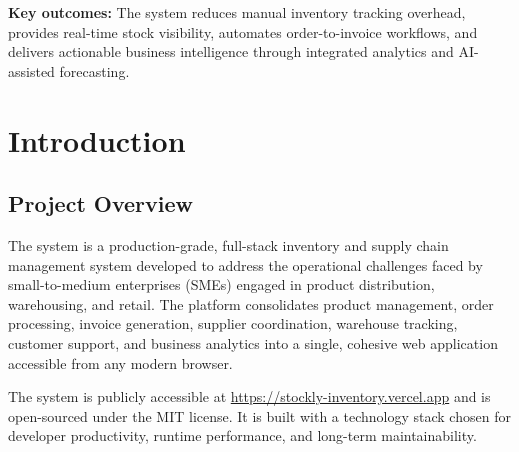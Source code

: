 ﻿\documentclass[12pt,a4paper]{report}
\begin{document}
\textbf{Key outcomes:} The system reduces manual inventory tracking overhead, provides real-time stock visibility, automates order-to-invoice workflows, and delivers actionable business intelligence through integrated analytics and AI-assisted forecasting.

\newpage

\tableofcontents
\newpage

\chapter{Introduction}

\section{Project Overview}

The system is a production-grade, full-stack inventory and supply chain management system developed to address the operational challenges faced by small-to-medium enterprises (SMEs) engaged in product distribution, warehousing, and retail. The platform consolidates product management, order processing, invoice generation, supplier coordination, warehouse tracking, customer support, and business analytics into a single, cohesive web application accessible from any modern browser.

The system is publicly accessible at \url{https://stockly-inventory.vercel.app} and is open-sourced under the MIT license. It is built with a technology stack chosen for developer productivity, runtime performance, and long-term maintainability.
\end{document}
